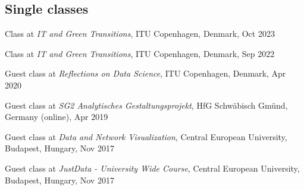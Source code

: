 \documentclass[10pt,a4paper]{article}
\renewenvironment{itemize}{
  \begin{list}{}{
    \setlength{\leftmargin}{1.5em}
    \setlength{\itemsep}{0.25em}
    \setlength{\parskip}{0pt}
    \setlength{\parsep}{0.25em}
  }
}{
  \end{list}
}
\begin{document}
\subsection*{Single classes}
\begin{itemize} 
\item{Class at \emph{IT and Green Transitions}, ITU Copenhagen, Denmark, Oct 2023}
\item{Class at \emph{IT and Green Transitions}, ITU Copenhagen, Denmark, Sep 2022}
\item{Guest class at \emph{Reflections on Data Science}, ITU Copenhagen, Denmark, Apr 2020}
\item{Guest class at \emph{SG2 Analytisches Gestaltungsprojekt}, HfG Schwäbisch Gmünd, Germany (online), Apr 2019}
\item{Guest class at \emph{Data and Network Visualization}, Central European University, Budapest, Hungary, Nov 2017}
\item{Guest class at \emph{JustData - University Wide Course}, Central European University, Budapest, Hungary, Nov 2017}
\end{itemize}
\end{document}

